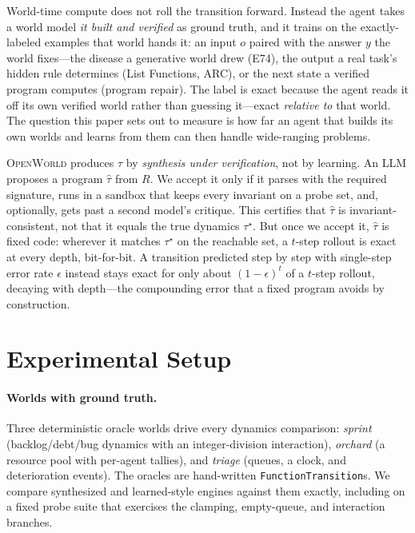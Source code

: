 \documentclass[11pt]{article}
\newcommand{\openworld}{\textsc{OpenWorld}}
\begin{document}
World-time compute does not roll the transition forward. Instead the agent takes a world
model \emph{it built and verified} as ground truth, and it trains on the exactly-labeled
examples that world hands it: an input $o$ paired with the answer $y$ the world fixes---the
disease a generative world drew (E74), the output a real task's hidden rule determines (List
Functions, ARC), or the next state a verified program computes (program repair). The label is
exact because the agent reads it off its own verified world rather than guessing it---exact
\emph{relative to} that world. The question this paper sets out to measure is how far an agent
that builds its own worlds and learns from them can then handle wide-ranging problems.

\openworld{} produces $\tau$ by \emph{synthesis under verification}, not by learning. An LLM
proposes a program $\hat\tau$ from $R$. We accept it only if it parses with the required
signature, runs in a sandbox that keeps every invariant on a probe set, and, optionally, gets
past a second model's critique. This certifies that $\hat\tau$ is invariant-consistent, not
that it equals the true dynamics $\tau^\star$. But once we accept it, $\hat\tau$ is fixed code:
wherever it matches $\tau^\star$ on the reachable set, a $t$-step rollout is exact at every
depth, bit-for-bit. A transition predicted step by step with single-step error rate $\epsilon$
instead stays exact for only about $(1-\epsilon)^t$ of a $t$-step rollout, decaying with
depth---the compounding error that a fixed program avoids by construction.

\section{Experimental Setup}
\paragraph{Worlds with ground truth.} Three deterministic oracle worlds drive
every dynamics comparison: \emph{sprint} (backlog/debt/bug
dynamics with an integer-division interaction), \emph{orchard} (a resource pool
with per-agent tallies), and \emph{triage} (queues, a clock, and
deterioration events). The oracles are hand-written
\texttt{FunctionTransition}s. We compare synthesized and learned-style engines
against them exactly, including on a fixed probe suite that
exercises the clamping, empty-queue, and interaction branches.
\end{document}
